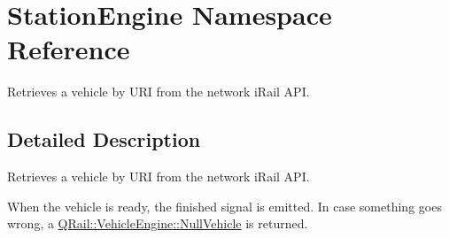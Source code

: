 \hypertarget{namespaceStationEngine}{}\section{Station\+Engine Namespace Reference}
\label{namespaceStationEngine}


Retrieves a vehicle by U\+RI from the network i\+Rail A\+PI.  




\subsection{Detailed Description}
Retrieves a vehicle by U\+RI from the network i\+Rail A\+PI. 

When the vehicle is ready, the finished signal is emitted. In case something goes wrong, a \mbox{\hyperlink{classQRail_1_1VehicleEngine_1_1NullVehicle}{Q\+Rail\+::\+Vehicle\+Engine\+::\+Null\+Vehicle}} is returned. 